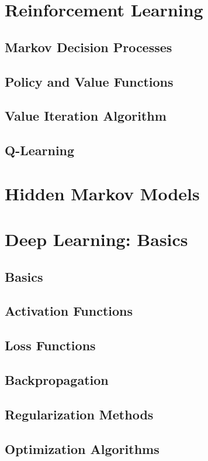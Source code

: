 \documentclass[twoside,twocolumn]{article}
\begin{document}
\section{Reinforcement Learning}
\subsection{Markov Decision Processes}
\subsection{Policy and Value Functions}
\subsection{Value Iteration Algorithm}
\subsection{Q-Learning}
\section{Hidden Markov Models}
\section{Deep Learning: Basics}
\subsection{Basics}
\subsection{Activation Functions}
\subsection{Loss Functions}
\subsection{Backpropagation}
\subsection{Regularization Methods}
\subsection{Optimization Algorithms}
\end{document}
